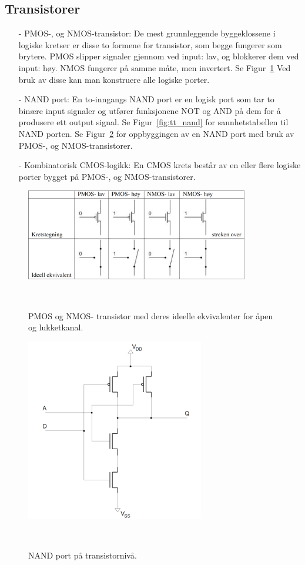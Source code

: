 \subsection{Transistorer}

    \begin{itemize}
        \item[-] PMOS-, og NMOS-transistor: De mest grunnleggende byggeklossene i logiske kretser er disse to formene for transistor, som begge fungerer som brytere.
        PMOS slipper signaler gjennom ved input: lav, og blokkerer dem ved input: høy.
        NMOS fungerer på samme måte, men invertert.
        Se Figur~\ref{fig:pnmos_transistors} Ved bruk av disse kan man konstruere alle logiske porter.
        \item[-] NAND port: En to-inngangs NAND port er en logisk port som tar to binære input signaler og utfører funksjonene NOT og AND på dem for å produsere ett output signal.
        Se Figur~\ref{fig:tt_nand} for sannhetstabellen til NAND porten.
        Se Figur~\ref{fig:NAND_transistorlevel} for oppbyggingen av en NAND port med bruk av PMOS-, og NMOS-transistorer.
        \item[-] Kombinatorisk CMOS-logikk: En CMOS krets består av en eller flere logiske porter bygget på PMOS-, og NMOS-transistorer.
    \end{itemize}

    \begin{figure}[!htb]
        \centering
        \includegraphics[height=4cm]{figurer/PNMOS.png}
        \caption{PMOS og NMOS- transistor med deres ideelle ekvivalenter for åpen og lukketkanal.}
        \label{fig:pnmos_transistors}
        ~\cite{labhefte}
    \end{figure}

    \begin{figure}[!htb]
        \centering
        \includegraphics[height=8cm]{figurer/NAND_transistorlevel.png}
        \caption{NAND port på transistornivå.}
        \label{fig:NAND_transistorlevel}
        ~\cite{labhefte}
    \end{figure}

